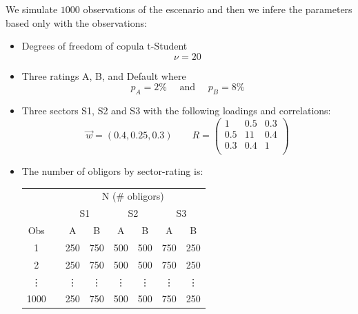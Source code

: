 \documentclass[11pt,fleqn]{book} %
\begin{document}
\begin{example}[1000 observations]
	We simulate $1000$ observations of the escenario and then we infere the
	parameters based only with the observations:
	\begin{itemize}
		\item Degrees of freedom of copula t-Student
		\begin{displaymath}
			\nu=20
		\end{displaymath}
		\item Three ratings A, B, and Default where
		\begin{displaymath}
			p_A=2\% \quad \text{ and } \quad p_B=8\%
		\end{displaymath}
		\item Three sectors S1, S2 and S3 with the following loadings and correlations:
		\begin{displaymath}
			\vec{w} = (0.4, 0.25, 0.3)
			\qquad 
			R = \left(
			\begin{array}{ccc}
				1 & 0.5 & 0.3 \\
				0.5 & 11 & 0.4 \\
				0.3 & 0.4 & 1 \\
			\end{array}
			\right) 
		\end{displaymath}
		\item The number of obligors by sector-rating is:\\
		\newline
		\begin{tabular}{cc|c|c||c|c||c|c|}
			\cline{3-8}
			& & \multicolumn{6}{|c|}{N (\# obligors)} \\
			\cline{3-8}
			& & \multicolumn{2}{|c||}{S1} & \multicolumn{2}{|c||}{S2} & \multicolumn{2}{|c|}{S3} \\
			\cline{1-1} \cline{3-8}
			\multicolumn{1}{|c|}{Obs} & & A & B & A & B & A & B \\
			\cline{1-1} \cline{3-8}
			\multicolumn{1}{|c|}{1} & & 250 & 750 & 500 & 500 & 750 & 250 \\
			\cline{1-1} \cline{3-8}
			\multicolumn{1}{|c|}{2} & & 250 & 750 & 500 & 500 & 750 & 250 \\
			\cline{1-1} \cline{3-8}
			\multicolumn{1}{|c|}{\vdots} & & \vdots & \vdots & \vdots & \vdots & \vdots & \vdots \\
			\cline{1-1} \cline{3-8}
			\multicolumn{1}{|c|}{1000} & & 250 & 750 & 500 & 500 & 750 & 250 \\
			\cline{1-1} \cline{3-8}
		\end{tabular}
	\end{itemize}
	

\end{example}
\end{document}
